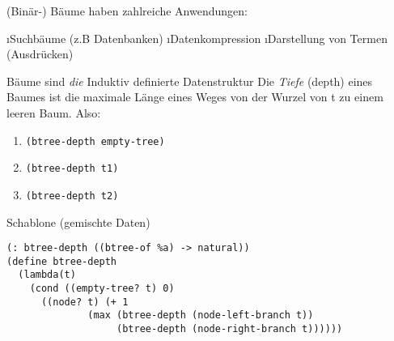 (Binär-) Bäume haben zahlreiche Anwendungen:
\begin{itemize}
\i Suchbäume (z.B Datenbanken)
\i Datenkompression
\i Darstellung von Termen (Ausdrücken)
\end{itemize}
Bäume sind \emph{die} Induktiv definierte Datenstruktur
Die \emph{Tiefe} (depth) eines Baumes ist die maximale Länge eines Weges von der Wurzel von t zu einem leeren Baum.
Also:
\begin{enumerate}[ \ ]
\item \lstinline|(btree-depth empty-tree)| 
\item \lstinline|(btree-depth t1)| 
\item \lstinline|(btree-depth t2)| 
\end{enumerate}
Schablone (gemischte Daten)
\begin{lstlisting}
(: btree-depth ((btree-of %a) -> natural))
(define btree-depth
  (lambda(t)
    (cond ((empty-tree? t) 0)
	  ((node? t) (+ 1
              (max (btree-depth (node-left-branch t))
                   (btree-depth (node-right-branch t))))))
\end{lstlisting}